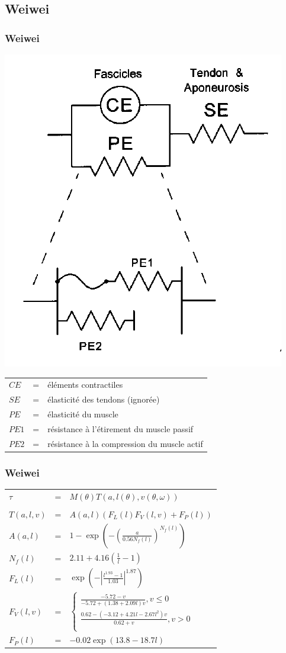 \documentclass{beamer}
\begin{document}

\subsection{Weiwei}

\begin{frame}
\frametitle{Weiwei}
\begin{center}
        \includegraphics[width=.40\linewidth]{fig/brown}
\end{center}
\begin{tabular}{lcl}
    $CE$  & = & éléments contractiles \\
    $SE$  & = & élasticité des tendons (ignorée) \\
    $PE$  & = & élasticité du muscle \\
    $PE1$ & = & résistance à l'étirement du muscle passif \\
    $PE2$ & = & résistance à la compression du muscle actif \\
\end{tabular}
\end{frame}

\begin{frame}
\frametitle{Weiwei}
\begin{tabular}{lcl}
    $\tau$ & = & $M(\theta) T(a, l(\theta), v(\theta, \omega))$ \\
    \\
    $T(a, l, v)$ & = & $A(a,l)(F_L(l) F_V(l,v) + F_P(l))$ \\
    $A(a, l)$    & = & $1 - \exp \left(- \left(\frac{a}{0.56 N_f(l)}\right)^{N_f(l)}\right)$ \\
    $N_f(l)$     & = & $2.11 + 4.16 \left(\frac{1}{l} - 1\right)$ \\
    $F_L(l)$     & = & $\exp \left(-\left|\frac{l^{1.93} - 1}{1.03}\right|^{1.87}\right)$ \\
    $F_V(l, v)$  & = & $\left\{ 
        \begin{array}{l}
            \frac{-5.72 - v}{-5.72 + (1.38 + 2.09 l) v}, v \leq 0 \\
            \frac{0.62 - \left(-3.12 + 4.21 l - 2.67 l^2\right) v}{0.62 + v}, v > 0 \\
        \end{array}
        \right.$ \\
    $F_P(l)$     & = & $-0.02 \exp(13.8 - 18.7 l)$ \\
\end{tabular}
\end{frame}
\end{document}
